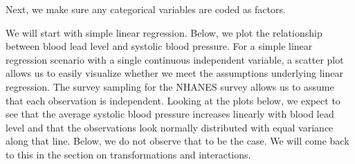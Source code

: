 \documentclass[
  letterpaper,
]{krantz}
\makeatletter
\newenvironment{Shaded}{\begin{snugshade}}{\end{snugshade}}
\newcommand{\AttributeTok}[1]{\textcolor[rgb]{0.40,0.45,0.13}{#1}}
\newcommand{\DecValTok}[1]{\textcolor[rgb]{0.68,0.00,0.00}{#1}}
\newcommand{\FunctionTok}[1]{\textcolor[rgb]{0.28,0.35,0.67}{#1}}
\newcommand{\NormalTok}[1]{\textcolor[rgb]{0.00,0.23,0.31}{#1}}
\newcommand{\OtherTok}[1]{\textcolor[rgb]{0.00,0.23,0.31}{#1}}
\newcommand{\SpecialCharTok}[1]{\textcolor[rgb]{0.37,0.37,0.37}{#1}}
\newcommand{\StringTok}[1]{\textcolor[rgb]{0.13,0.47,0.30}{#1}}
\newenvironment{kframe}{%
\medskip{}
\setlength{\fboxsep}{.8em}
 \def\at@end@of@kframe{}%
 \ifinner\ifhmode%
  \def\at@end@of@kframe{\end{minipage}}%
  \begin{minipage}{\columnwidth}%
 \fi\fi%
 \def\FrameCommand##1{\hskip\@totalleftmargin \hskip-\fboxsep
 \colorbox{shadecolor}{##1}\hskip-\fboxsep
     \hskip-\linewidth \hskip-\@totalleftmargin \hskip\columnwidth}%
 \MakeFramed {\advance\hsize-\width
   \@totalleftmargin\z@ \linewidth\hsize
   \@setminipage}}%
 {\par\unskip\endMakeFramed%
 \at@end@of@kframe}
\renewenvironment{Shaded}{\begin{kframe}}{\end{kframe}}
\makeatother
\begin{document}
Next, we make sure any categorical variables are coded as factors.

\begin{Shaded}
\end{Shaded}

We will start with simple linear regression. Below, we plot the
relationship between blood lead level and systolic blood pressure. For a
simple linear regression scenario with a single continuous independent
variable, a scatter plot allows us to easily visualize whether we meet
the assumptions underlying linear regression. The survey sampling for
the NHANES survey allows us to assume that each observation is
independent. Looking at the plots below, we expect to see that the
average systolic blood pressure increases linearly with blood lead level
and that the observations look normally distributed with equal variance
along that line. Below, we do not observe that to be the case. We will
come back to this in the section on transformations and interactions.

\begin{Shaded}
\end{Shaded}
\end{document}
